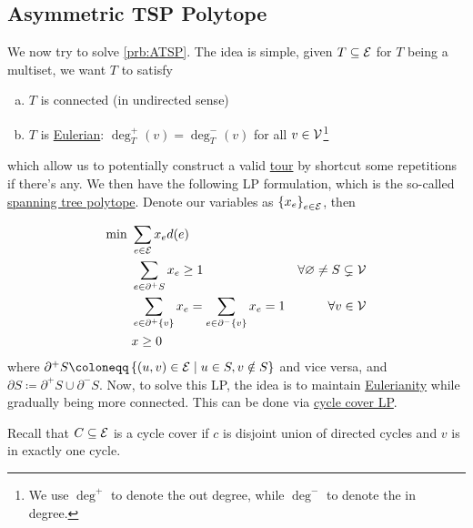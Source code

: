 \subsection{Asymmetric TSP Polytope}
We now try to solve \autoref{prb:ATSP}. The idea is simple, given \(T\subseteq \mathcal{\MakeUppercase{e}} \) for \(T\) being a multiset, we want \(T\) to satisfy
\begin{enumerate}[(a)]
	\item \(T\) is connected (in undirected sense)
	\item \(T\) is \href{https://en.wikipedia.org/wiki/Eulerian_path}{Eulerian}: \(\deg_T^+(v) = \deg_T^-(v)\) for all \(v\in \mathcal{\MakeUppercase{v}} \)\footnote{We use \(\deg^+\) to denote the out degree, while \(\deg^-\) to denote the in degree.}
\end{enumerate}
which allow us to potentially construct a valid \hyperref[def:tour]{tour} by shortcut some repetitions if there's any. We then have the following LP formulation, which is the so-called \hyperref[eq:lec11]{spanning tree polytope}. Denote our variables as \(\left\{ x_e \right\} _{e\in \mathcal{\MakeUppercase{e}} }\), then

\begin{equation}\label{eq:lec11}
	\begin{aligned}
		\min~ & \sum_{e\in \mathcal{\MakeUppercase{e}} } x_e d(e)                                                                                             \\
		      & \sum_{e\in \partial ^+ S} x_e \geq 1                                      & \forall \varnothing \neq S \subsetneq \mathcal{\MakeUppercase{v}} \\
		      & \sum_{e\in \partial ^+ \{v\}} x_e = \sum_{e\in \partial ^- \{v\}} x_e = 1 & \forall v\in \mathcal{\MakeUppercase{v}}                          \\
		      & x \geq 0
	\end{aligned}
\end{equation}
where \(\partial ^+ S\coloneqq \left\{ (u, v)\in \mathcal{\MakeUppercase{e}} \mid u\in S, v \notin S \right\} \) and vice versa, and \(\partial S\coloneqq \partial ^+S \cup \partial ^-S\). Now, to solve this LP, the idea is to maintain \href{https://en.wikipedia.org/wiki/Eulerian_path}{Eulerianity} while gradually being more connected. This can be done via \hyperref[subsec:cycle-covering-LP]{cycle cover LP}.

\begin{prev}
	Recall that \(C \subseteq \mathcal{\MakeUppercase{e}} \) is a cycle cover if \(c\) is disjoint union of directed cycles and \(v\) is in exactly one cycle.
\end{prev}

